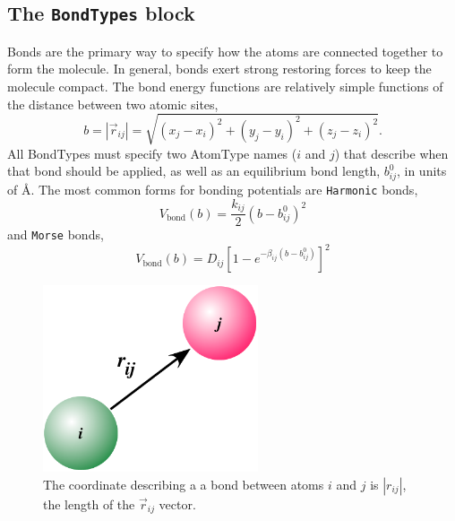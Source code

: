 \documentclass[letterpaper]{report}
\begin{document}
\subsection{\label{section:ffBond}The {\tt BondTypes} block}

Bonds are the primary way to specify how the atoms are connected
together to form the molecule.  In general, bonds exert strong
restoring forces to keep the molecule compact.  The bond energy
functions are relatively simple functions of the distance between two
atomic sites,
\begin{equation}
b = \left| \vec{r}_{ij} \right| = \sqrt{(x_j - x_i)^2 + (y_j - y_i)^2
  + (z_j - z_i)^2}.
\end{equation} 
All BondTypes must specify two AtomType names ($i$ and $j$) that
describe when that bond should be applied, as well as an equilibrium
bond length, $b_{ij}^0$, in units of \AA. The most common forms for
bonding potentials are {\tt Harmonic} bonds,
\begin{equation}
V_{\text{bond}}(b) = \frac{k_{ij}}{2} \left(b - 
  b_{ij}^0 \right)^2
\end{equation}
and {\tt Morse} bonds,
\begin{equation}
V_{\text{bond}}(b) = D_{ij} \left[ 1 - e^{-\beta_{ij} (b - b_{ij}^0)} \right]^2
\end{equation}

\begin{figure}[h]
\centering
\includegraphics[width=2.5in]{bond.pdf}
\caption[Bond coordinates]{The coordinate describing a
a bond between atoms $i$ and $j$ is $|r_{ij}|$, the length of the
$\vec{r}_{ij}$ vector. } 
\label{fig:bond}
\end{figure}
\end{document}
